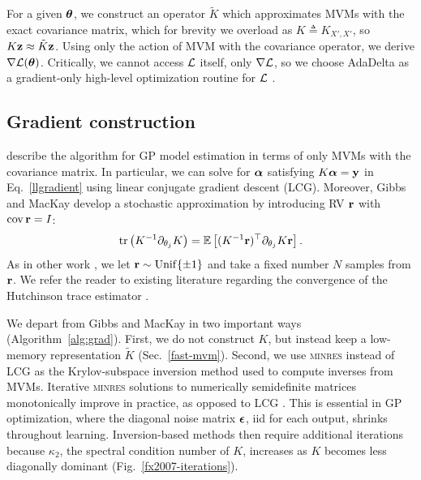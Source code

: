 \documentclass[twoside]{article}
\begin{document}
For a given ${\boldsymbol\theta}$, we construct an operator $\tilde{K}$ which approximates MVMs with the exact covariance matrix, which for brevity we overload as $K\triangleq K_{X',X'}$, so $K\textbf{z}\approx \tilde{K}\textbf{z}$. Using only the action of MVM with the covariance operator, we derive $\nabla\mathcal{L}({\boldsymbol\theta})$. Critically, we cannot access $\mathcal{L}$ itself, only $\nabla\mathcal{L}$, so we choose AdaDelta as a gradient-only high-level optimization routine for $\mathcal{L}$ \citep{zeiler2012adadelta}.


\subsection{Gradient construction}

\citet{gibbs1996cient} describe the algorithm for GP model estimation in terms of only MVMs with the covariance matrix. In particular, we can solve for ${\boldsymbol\alpha}$ satisfying $K{\boldsymbol\alpha}=\textbf{y}$ in Eq.~\ref{llgradient} using linear conjugate gradient descent (LCG). Moreover, Gibbs and MacKay develop a stochastic approximation by introducing RV ${\textbf{r}}$ with $\operatorname{cov} {\textbf{r}}=I$:
\begin{align}
  \operatorname{tr}\left({K^{-1}\partial_{\theta_j}K}\right) = \operatorname{\mathbb{E}}\left[(K^{-1}{\textbf{r}})^\top\partial_{\theta_j}K{\textbf{r}}\right]\label{eq:trace}.
\end{align}
As in other work \citep{cutajar2016preconditioning}, we let ${\textbf{r}}\sim\operatorname{Unif}\{\pm 1\}$ and take a fixed number $N$ samples from ${\textbf{r}}$. We refer the reader to existing literature regarding the convergence of the Hutchinson trace estimator \citep{avron2011randomized}.

We depart from Gibbs and MacKay in two important ways (Algorithm~\ref{alg:grad}). First, we do not construct $K$, but instead keep a low-memory representation $\tilde{K}$ (Sec.~\ref{fast-mvm}). Second, we use \textsc{minres} instead of LCG as the Krylov-subspace inversion method used to compute inverses from MVMs. Iterative \textsc{minres} solutions to numerically semidefinite matrices monotonically improve in practice, as opposed to LCG \citep{fong2012cg}. This is essential in GP optimization, where the diagonal noise matrix ${\boldsymbol\epsilon}$, iid for each output, shrinks throughout learning. Inversion-based methods then require additional iterations because $\kappa_2$, the spectral condition number of $K$, increases as $K$ becomes less diagonally dominant (Fig.~\ref{fx2007-iterations}).
\end{document}
